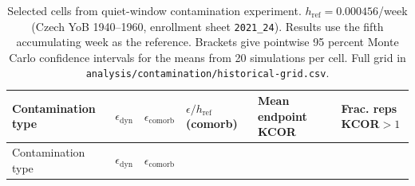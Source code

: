 \documentclass[
]{article}
\begin{document}
\newpage

\begin{longtable}[]{@{}
  >{\raggedright\arraybackslash}p{}
  >{\raggedright\arraybackslash}p{}
  >{\raggedright\arraybackslash}p{}
  >{\raggedright\arraybackslash}p{}
  >{\raggedright\arraybackslash}p{}
  >{\raggedright\arraybackslash}p{}@{}}
\caption{Selected cells from quiet-window contamination experiment. \(h_{\mathrm{ref}}=0.000456\)/week (Czech YoB 1940--1960, enrollment sheet \protect\texttt{2021\_24}). Results use the fifth accumulating week as the reference. Brackets give pointwise 95 percent Monte Carlo confidence intervals for the means from 20 simulations per cell. Full grid in \protect\texttt{analysis/contamination/historical-grid.csv}.}\label{tbl:quiet_contam}\tabularnewline
\toprule\noalign{}
\begin{minipage}[b]{\linewidth}\raggedright
Contamination type
\end{minipage} & \begin{minipage}[b]{\linewidth}\raggedright
\(\epsilon_{\mathrm{dyn}}\)
\end{minipage} & \begin{minipage}[b]{\linewidth}\raggedright
\(\epsilon_{\mathrm{comorb}}\)
\end{minipage} & \begin{minipage}[b]{\linewidth}\raggedright
\(\epsilon/h_{\mathrm{ref}}\) (comorb)
\end{minipage} & \begin{minipage}[b]{\linewidth}\raggedright
Mean endpoint KCOR
\end{minipage} & \begin{minipage}[b]{\linewidth}\raggedright
Frac. reps KCOR\(>1\)
\end{minipage} \\
\midrule\noalign{}
\endfirsthead
\toprule\noalign{}
\begin{minipage}[b]{\linewidth}\raggedright
Contamination type
\end{minipage} & \begin{minipage}[b]{\linewidth}\raggedright
\(\epsilon_{\mathrm{dyn}}\)
\end{minipage} & \begin{minipage}[b]{\linewidth}\raggedright
\(\epsilon_{\mathrm{comorb}}\)

\end{minipage}
\end{longtable}
\end{document}
